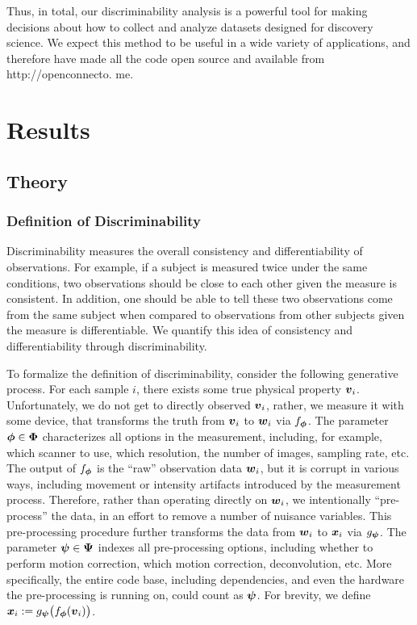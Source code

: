 \documentclass{article}
\begin{document}
Thus, in total, our discriminability analysis is a powerful tool for making decisions about how to collect and analyze
datasets designed for discovery science. We expect this method to be useful in a wide variety of applications,
and therefore have made all the code open source and available from http://openconnecto.
me.




\section{Results}



\subsection{Theory}

\subsubsection{Definition of Discriminability}
 Discriminability measures the overall consistency and differentiability of observations. For example, if a subject is measured twice under the same conditions, two observations should be close to each other given the measure is consistent. In addition, one should be able to tell these two observations come from the same subject when compared to observations from other subjects given the measure is differentiable. We quantify this idea of consistency and differentiability through discriminability. 
 
To formalize the definition of discriminability, consider the following generative process. For each sample $i$, there exists some true physical property $\boldsymbol{v}_i$. Unfortunately, we do not get to directly observed $\boldsymbol{v}_i$, rather, we measure it with some device, that transforms the truth from $\boldsymbol{v}_i$ to $\boldsymbol{w}_i$ via $f_{\boldsymbol{\phi}}$.  The parameter $\boldsymbol{\phi} \in \boldsymbol{\Phi}$ characterizes all options in the measurement, including, for example, which scanner to use, which resolution, the number of images, sampling rate, etc.  The output of $f_{\boldsymbol{\phi}}$ is the  ``raw'' observation data $\boldsymbol{w}_i$, but it is corrupt in various ways, including movement or intensity artifacts introduced by the measurement process.  Therefore, rather than operating directly on $\boldsymbol{w}_i$, we intentionally ``pre-process'' the data, in an effort to remove a number of nuisance variables.  This pre-processing procedure further transforms the data from $\boldsymbol{w}_i$ to $\boldsymbol{x}_i$ via $g_{\boldsymbol{\psi}}$.   The parameter $\boldsymbol{\psi} \in \boldsymbol{\Psi}$ indexes all pre-processing options, including whether to perform motion correction, which motion correction, deconvolution, etc.  More specifically, the entire code base, including dependencies, and even the hardware the pre-processing is running on, could count as $\boldsymbol{\psi}$. For brevity, we define $\boldsymbol{x}_i:= g_{\boldsymbol{\psi}} \big(f_{\boldsymbol{\phi}} (\boldsymbol{v}_i) \big)$.
\end{document}

